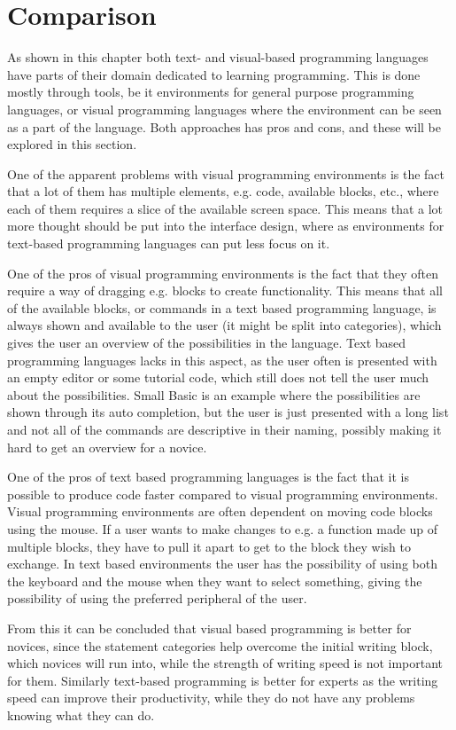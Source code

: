 \section{Comparison}
\label{sec:comparison_text_visual}
As shown in this chapter both text- and visual-based programming languages have parts of their domain dedicated to learning programming. This is done mostly through tools, be it environments for general purpose programming languages, or visual programming languages where the environment can be seen as a part of the language. Both approaches has pros and cons, and these will be explored in this section.

\begin{description}[style=nextline]
\item[Interface Layout] One of the apparent problems with visual programming environments is the fact that a lot of them has multiple elements, e.g. code, available blocks, etc., where each of them requires a slice of the available screen space. This means that a lot more thought should be put into the interface design, where as environments for text-based programming languages can put less focus on it.
\item[Statement Categories] One of the pros of visual programming environments is the fact that they often require a way of dragging e.g. blocks to create functionality. This means that all of the available blocks, or commands in a text based programming language, is always shown and available to the user (it might be split into categories), which gives the user an overview of the possibilities in the language. Text based programming languages lacks in this aspect, as the user often is presented with an empty editor or some tutorial code, which still does not tell the user much about the possibilities. Small Basic is an example where the possibilities are shown through its auto completion, but the user is just presented with a long list and not all of the commands are descriptive in their naming, possibly making it hard to get an overview for a novice.
\item[Writing Speed] One of the pros of text based programming languages is the fact that it is possible to produce code faster compared to visual programming environments. Visual programming environments are often dependent on moving code blocks using the mouse. If a user wants to make changes to e.g. a function made up of multiple blocks, they have to pull it apart to get to the block they wish to exchange. In text based environments the user has the possibility of using both the keyboard and the mouse when they want to select something, giving the possibility of using the preferred peripheral of the user.
\end{description}

From this it can be concluded that visual based programming is better for novices, since the statement categories help overcome the initial writing block, which novices will run into, while the strength of writing speed is not important for them.
Similarly text-based programming is better for experts as the writing speed can improve their productivity, while they do not have any problems knowing what they can do.